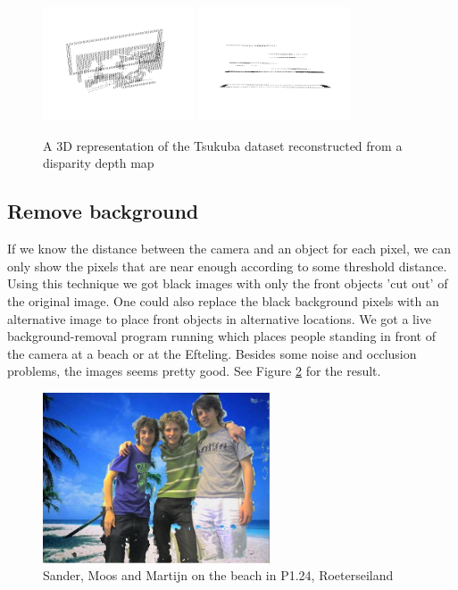 \documentclass[a4paper]{article}
\begin{document}
\begin{figure}[h!bt]
\centering
\includegraphics[width=0.4\textwidth]{3drep1}
\includegraphics[width=0.4\textwidth]{3drep2}
\caption{A 3D representation of the Tsukuba dataset reconstructed from a
disparity depth map}
\label{3drep}
\end{figure}

\subsection{Remove background}
If we know the distance between the camera and an object for each pixel,
we can only show the pixels that are near enough according to some threshold
distance. Using this technique we got black images with only the front objects 'cut out' of the original image. One could also replace the black background pixels with an alternative image to place front objects in alternative locations. We got a live background-removal program running which places people standing in front of the camera at a beach or at the Efteling. Besides some noise and occlusion problems, the images seems pretty good. See Figure \ref{remove-bg} for the result.

\begin{figure}[h!bt]
\centering
\includegraphics[width=0.6\textwidth]{remove-bg1}
\caption{Sander, Moos and Martijn on the beach in P1.24, Roeterseiland}
\label{remove-bg}
\end{figure}
\end{document}
